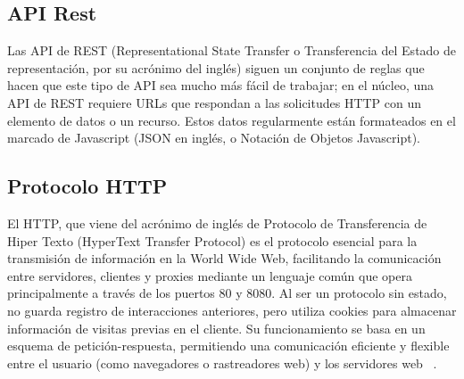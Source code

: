 \subsection{API Rest}
Las API de REST (Representational State Transfer o Transferencia del Estado de representación, por su acrónimo del inglés) siguen un conjunto de reglas que hacen que este tipo de API sea mucho más fácil de trabajar; en el núcleo, una API de REST requiere URLs que respondan a las solicitudes HTTP con un elemento de datos o un recurso. Estos datos regularmente están formateados en el marcado de Javascript (JSON en inglés, o Notación de Objetos Javascript). 

\subsection{Protocolo HTTP}
El HTTP, que viene del acrónimo de inglés de Protocolo de Transferencia de Hiper Texto (HyperText Transfer Protocol) es el protocolo esencial para la transmisión de información en la World Wide Web, facilitando la comunicación entre servidores, clientes y proxies mediante un lenguaje común que opera principalmente a través de los puertos 80 y 8080. Al ser un protocolo sin estado, no guarda registro de interacciones anteriores, pero utiliza cookies para almacenar información de visitas previas en el cliente. Su funcionamiento se basa en un esquema de petición-respuesta, permitiendo una comunicación eficiente y flexible entre el usuario (como navegadores o rastreadores web) y los servidores web ~\cite{HTTPEditorialEtece}.

